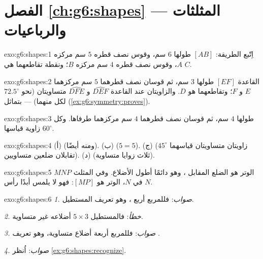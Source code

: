 \section*{الفصل \ref{ch:g6:shapes} --- المثلثات والرباعيات}

\begin{solution}{exo:g6:shapes:1}
اِتّبع الطريقة:  $[AB]$ طولها $6$ سم، وقوس نصف قطره $5$ سم
مركزه $A$، وقوس نصف قطره $4$ سم مركزه $B$؛ ونقطة
تقاطعهما هي $C$.
\end{solution}

\begin{solution}{exo:g6:shapes:2}
القاعدة $[EF]$ طولها $3$ سم، ثم قوسان نصف قطرهما $5$ سم مركزهما $E$
و $F$؛ وتقاطعهما هو $D$. والزاويتان عند القاعدة $\widehat{DEF}$
و $\widehat{DFE}$ متساويتان (نحو $72.5^\circ$ لكل منهما) --- بتماثل
 (\cref{ex:g6:symmetry:proves}).
\end{solution}

\begin{solution}{exo:g6:shapes:3}
 طولها $4$ سم، ثم قوسان نصف قطرهما $4$ سم مركزهما
طرفاها. وكل زاوية قياسها $60^\circ$.
\end{solution}

\begin{solution}{exo:g6:shapes:4}
(أ)  (ومنه  أيضًا). \quad
(ب)  ($5 = 5$). \quad
(ج)   (زاويتان متساويتان قياسهما $45^\circ$ تقابلان
ضلعين متساويين). \quad
(د)  (ثلاث زوايا متساوية).
\end{solution}

\begin{solution}{exo:g6:shapes:5}
الوتر هو الضلع المقابل ، وهو دائمًا أطول
الأضلاع. وفي المثلث $MNP$  في $N$، الوتر هو $[MP]$: فهو لا
يلمس أبدًا رأس  $N$.
\end{solution}

\begin{solution}{exo:g6:shapes:6}
\emph{1. صواب}: فللمربع أربع ، وهو
تعريف المستطيل.

\emph{2. خطأ}: فالمستطيل $5 \times 3$ أضلاعه غير متساوية.

\emph{3. صواب}: فللمربع أربعة أضلاع متساوية، وهو تعريف
.

\emph{4. صواب}: اُنظر \cref{ex:g6:shapes:recognize}.
\end{solution}

